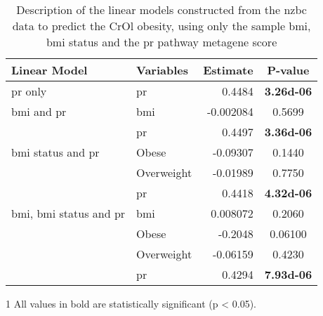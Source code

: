 	\begin{table}[htpb]
		\centering
		\caption[Description of the linear models constructed from the \gls{nzbc} data to predict the CrOl obesity, using only the sample \gls{bmi}, \gls{bmi} status and the \acrshort{pr} pathway metagene score]{Description of the linear models constructed from the \gls{nzbc} data to predict the CrOl obesity, using only the sample \gls{bmi}, \gls{bmi} status and the \gls{pr} pathway metagene score}
		\label{tab:lm_pr_only_crol}
		\begin{threeparttable}
			\begin{tabular}{llrc}
				Linear Model & Variables & Estimate & {P-value}\\
					\hline
					\hline
					\rule{0pt}{2.25ex}\gls{pr} only                            & \gls{pr}   & 0.4484    & \bfseries \num{3.26d-06} \tnote{1} \\
					\hline
					\rule{0pt}{2.25ex}\gls{bmi} and \gls{pr}                   & \gls{bmi}  & -0.002084 & 0.5699  \\
                                                                               & \gls{pr}   & 0.4497    & \bfseries \num{3.36d-06} \\
					\hline
					\rule{0pt}{2.25ex}\gls{bmi} status and \gls{pr}            & Obese      & -0.09307  & 0.1440   \\
                                                                               & Overweight & -0.01989  & 0.7750   \\
                                                                               & \gls{pr}   & 0.4418    & \bfseries \num{4.32d-06} \\
					\hline
					\rule{0pt}{2.25ex}\gls{bmi}, \gls{bmi} status and \gls{pr} & \gls{bmi}  & 0.008072  & 0.2060   \\
                                                                               & Obese      & -0.2048   & 0.06100   \\
                                                                               & Overweight & -0.06159  & 0.4230   \\
                                                                               & \gls{pr}   & 0.4294    & \bfseries \num{7.93d-06} \\
					\hline
					\hline
			\end{tabular}
				\begin{tablenotes}
					\begin{footnotesize}
					\item [1] All values in bold are statistically significant (p \textless{} 0.05).
					\end{footnotesize}
				\end{tablenotes}
		\end{threeparttable}
	\end{table}

